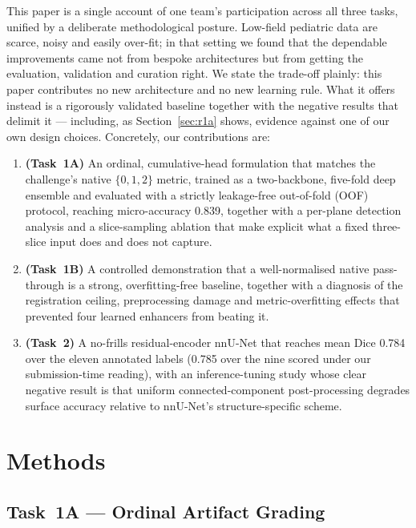 \documentclass[runningheads]{llncs}
\begin{document}
This paper is a single account of one team's participation across all three
tasks, unified by a deliberate methodological posture. Low-field pediatric data
are scarce, noisy and easily over-fit; in that setting we found that the
dependable improvements came not from bespoke architectures but from getting the
evaluation, validation and curation right. We state the trade-off
plainly: this paper contributes no new architecture and no new learning rule. What it
offers instead is a rigorously validated baseline together with the negative results
that delimit it --- including, as Section~\ref{sec:r1a} shows, evidence against one of
our own design choices. Concretely, our contributions are:
\begin{enumerate}
  \item \textbf{(Task~1A)} An ordinal, cumulative-head formulation that matches
        the challenge's native $\{0,1,2\}$ metric, trained as a two-backbone,
        five-fold deep ensemble and evaluated with a strictly leakage-free
        out-of-fold (OOF) protocol, reaching micro-accuracy 0.839,
        together with a per-plane detection analysis and a slice-sampling ablation
        that make explicit what a fixed three-slice input does and does not capture.
  \item \textbf{(Task~1B)} A controlled demonstration that a well-normalised
        native pass-through is a strong, overfitting-free baseline, together with
        a diagnosis of the registration ceiling, preprocessing damage and
        metric-overfitting effects that prevented four learned enhancers from
        beating it.
  \item \textbf{(Task~2)} A no-frills residual-encoder nnU-Net that reaches mean
        Dice 0.784 over the eleven annotated labels (0.785 over the nine
        scored under our submission-time reading), with an inference-tuning study
        whose clear negative result is that uniform connected-component
        post-processing degrades surface accuracy relative to nnU-Net's
        structure-specific scheme.
\end{enumerate}

\FloatBarrier
\section{Methods}
\label{sec:methods}

\subsection{Task~1A --- Ordinal Artifact Grading}
\label{sec:m1a}
\end{document}
